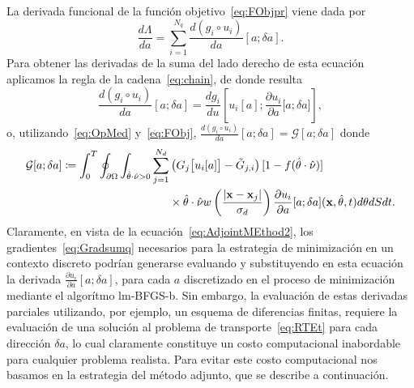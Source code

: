 La derivada funcional de la función objetivo~\eqref{eq:FObjpr} viene 
dada por
\begin{equation}
  \frac{d \Lambda}{da} = \sum_{i=1}^{N_q} \frac{d (g_i\circ
    u_i)}{da}[a;\delta a].
\label{eq:Gradsumq}
\end{equation}
Para obtener las derivadas de la suma del lado derecho 
de esta ecuación aplicamos la regla de la cadena~\eqref{eq:chain}, 
de donde resulta  
\begin{equation}
\frac{d (g_i\circ u_i)}{da}[a;\delta a] = \frac{d g_i}{
    d u}\left[u_i[a];\frac{\partial u_i}{\partial a} \big[a;\delta
    a\big]\right],
  \label{eq:AdjointMEthod}
\end{equation} 
o, utilizando~\eqref{eq:OpMed} y~\eqref{eq:FObj}, $\frac{d (g_i\circ u_i)}{da}[a;\delta a]=\mathcal{G}[a;\delta a]$ donde
\begin{equation}
\begin{split}
\begin{aligned}
  \mathcal{G}[a;\delta a]\coloneqq 
  \int_0^T \oint_{\partial \Omega} \int_{\hat{\theta} \cdot \hat{\nu}>0}
  \sum_{j=1}^{N_d} &\left( G_j\big[u_i[a]\big]-
    \tilde {G}_{j,i} \right) [1-f(\hat{\theta} \cdot \hat{\nu})]\\ 
   &\times \hat{\theta} \cdot \hat{\nu} w\left( \frac{ |\mathbf{x}-\mathbf{x}_j |}{\sigma_d}
  \right) \frac{\partial u_i}{\partial a}[a;\delta a](\mathbf{x},\hat{\theta},t)
  d\theta dS dt.
\end{aligned}
\end{split}
\label{eq:AdjointMEthod2}
\end{equation}
Claramente, en vista de la ecuación~\eqref{eq:AdjointMEthod2}, 
los gradientes~\eqref{eq:Gradsumq} necesarios para la estrategia 
de minimización en un contexto discreto podrían generarse 
evaluando y substituyendo en esta ecuación la derivada 
$\frac{\partial u_i}{\partial a}[a;\delta a]$, para cada $a$ 
discretizado en el proceso de minimización mediante el algorítmo lm-BFGS-b. 
Sin embargo, la evaluación de estas derivadas parciales utilizando, 
por ejemplo, un esquema de diferencias finitas, requiere la evaluación 
de una solución al problema de transporte~\eqref{eq:RTEt} para 
cada dirección $\delta a$, lo cual claramente constituye 
un costo computacional inabordable para cualquier problema realista. 
Para evitar este costo computacional nos basamos en la 
estrategia del método adjunto, que se describe a continuación.

